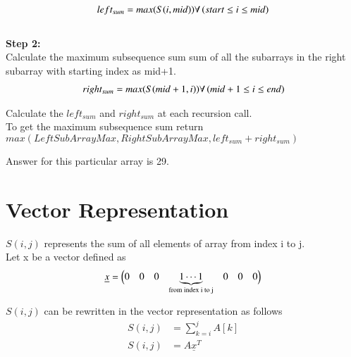 \documentclass[journal,12pt,twocolumn]{IEEEtran}
\begin{document}
\begin{align}
    left_{sum} = max(S(i,mid)) \forall \left(start \le i \le mid \right)    
\end{align}\\

\textbf{Step 2:}\\
Calculate the maximum subsequence sum sum of all the subarrays in the right subarray with starting index as mid+1.
\begin{align}
    right_{sum} = max(S(mid+1,i))  \forall \left(mid+1 \le i \le end \right)
\end{align}

Calculate the $left_{sum}$ and $right_{sum}$ at each recursion call.\\
To get the maximum subsequence sum return $max(LeftSubArrayMax,RightSubArrayMax,left_{sum}+right_{sum})$ 

\begin{figure}[!ht]
    \begin{center}
		\resizebox{\columnwidth}{!}{}
	\end{center}
\caption{}
\label{fig:ee18btech11035_block}
\end{figure}

Answer for this particular array is 29.

\section{Vector Representation}

$S(i,j)$ represents the sum of all elements of array from index i to j.\\

Let x be a vector defined as \\
\newcommand{\block}[1]{
  \underbrace{1 \cdots 1}_{#1}
}
\begin{align}
    \underline{x} = 
    \begin{pmatrix}
    0 & 0 & 0 & \smash[b]{\block{\text{from index i to j}}} & 0 & 0 & 0
    \end{pmatrix}
\end{align}\\

$S(i,j)$ can be rewritten in the vector representation as follows \\
\begin{align}
     S(i,j) &=  \sum_{k=i}^{j} A[k] \\
     S(i,j) &= A\underline{x}^{T}
\end{align}
\end{document}
